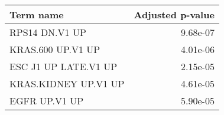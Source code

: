 \begin{tabular}{lr}
\toprule
            Term name &  Adjusted p-value \\
\midrule
       RPS14 DN.V1 UP &          9.68e-07 \\
    KRAS.600 UP.V1 UP &          4.01e-06 \\
 ESC J1 UP LATE.V1 UP &          2.15e-05 \\
 KRAS.KIDNEY UP.V1 UP &          4.61e-05 \\
        EGFR UP.V1 UP &          5.90e-05 \\
\bottomrule
\end{tabular}
